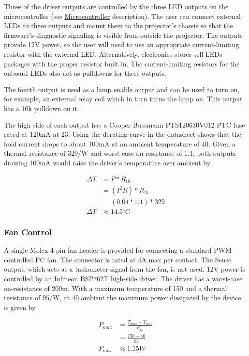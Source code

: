 \documentclass{article}
\newcommand{\degree}{\ensuremath{^{\circ}}}
\begin{document}
Three of the driver outputs are controlled by the three LED outputs on the microcontroller (see
\hyperref[sssec:Microcontroller]{Microcontroller} description).  The user can connect external LEDs
to these outputs and mount them to the projector's chassis so that the firmware's diagnostic
signaling is visible from outside the projector.  The outputs provide 12V power, so the user will
need to use an appropriate current-limiting resistor with the external LED.  Alternatively,
electronics stores sell LEDs packages with the proper resistor built in.  The current-limiting
resistors for the onboard LEDs also act as pulldowns for these outputs.

The fourth output is used as a lamp enable output and can be used to turn on, for example, an
external relay coil which in turn turns the lamp on.  This output has a 10k pulldown on it.

The high side of each output has a Cooper Bussmann PTS120630V012 PTC fuse rated at 120mA at
23\textcelsius{}.  Using the derating curve in the datasheet shows that the hold current drops to
about 100mA at an ambient temperature of 40\textcelsius{}.  Given a thermal resistance of
329\textcelsius{}/W and worst-case on-resistance of 1.1\textOmega, both outputs drawing 100mA would
raise the driver's temperature over ambient by

\begin{align*}
    \Delta T &= P * R_{th} \\
    &= (I^2R) * R_{th} \\
    &= (0.04 * 1.1) * 329 \\
    \Delta T &\approx 14.5\degree C
\end{align*}

\subsubsection{Fan Control} \label{sssec:FanControl}
A single Molex 4-pin fan header is provided for connecting a standard PWM-controlled PC fan.  The
connector is rated at 4A max per contact.  The Sense output, which acts as a tachometer signal from
the fan, is not used.  12V power is controlled by an Infineon BSP762T high-side driver.  The driver
has a worst-case on-resistance of 200m\textOmega.  With a maximum temperature of 150\textcelsius{}
and a thermal resistance of 95\textcelsius{}/W, at 40\textcelsius{} ambient the maximum power
dissipated by the device is given by

\begin{align*}
    P_{max} &= \frac{T_{max}-T_{amb}}{R_{th}} \\
    &= \frac{150 - 40}{95} \\
    P_{max} &\approx 1.15W
\end{align*}
\end{document}

